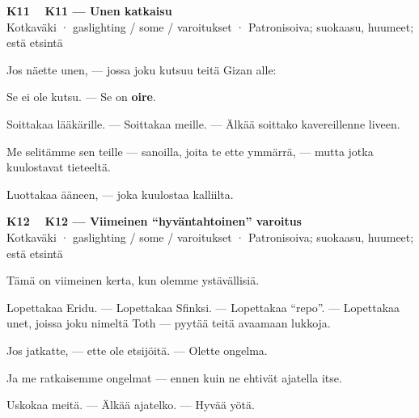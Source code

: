 \documentclass[a4paper,11pt]{article}
\begin{document}
\filbreak
\vspace{0.9mm}
\noindent
\begin{tcolorbox}[
  colframe=eaglecol,
  colback=white,
  boxrule=0.8pt,
  arc=0pt,
  outer arc=0pt,
  left=2.5mm, right=2.5mm, top=2mm, bottom=2mm,
  boxsep=0.5mm,
  sharp corners,
  enhanced,
  breakable=false
]
{\large\ttfamily\bfseries K11}~~
{\normalsize\bfseries K11 --- Unen katkaisu}\\[0.2em]
{\small\color{black!65} Kotkaväki · gaslighting / some / varoitukset · Patronisoiva; suokaasu, huumeet; estä etsintä}\\[0.35em]
{\normalsize\raggedright Jos näette unen, --- jossa joku kutsuu teitä Gizan alle:

Se ei ole kutsu. --- Se on \textbf{oire}.

Soittakaa lääkärille. --- Soittakaa meille. --- Älkää soittako kavereillenne liveen.

Me selitämme sen teille --- sanoilla, joita te ette ymmärrä, --- mutta jotka kuulostavat tieteeltä.

Luottakaa ääneen, --- joka kuulostaa kalliilta.}
\end{tcolorbox}

\filbreak
\vspace{0.9mm}
\noindent
\begin{tcolorbox}[
  colframe=eaglecol,
  colback=white,
  boxrule=0.8pt,
  arc=0pt,
  outer arc=0pt,
  left=2.5mm, right=2.5mm, top=2mm, bottom=2mm,
  boxsep=0.5mm,
  sharp corners,
  enhanced,
  breakable=false
]
{\large\ttfamily\bfseries K12}~~
{\normalsize\bfseries K12 --- Viimeinen ``hyväntahtoinen'' varoitus}\\[0.2em]
{\small\color{black!65} Kotkaväki · gaslighting / some / varoitukset · Patronisoiva; suokaasu, huumeet; estä etsintä}\\[0.35em]
{\normalsize\raggedright Tämä on viimeinen kerta, kun olemme ystävällisiä.

Lopettakaa Eridu. --- Lopettakaa Sfinksi. --- Lopettakaa ``repo''. --- Lopettakaa unet, joissa joku nimeltä Toth --- pyytää teitä avaamaan lukkoja.

Jos jatkatte, --- ette ole etsijöitä. --- Olette ongelma.

Ja me ratkaisemme ongelmat --- ennen kuin ne ehtivät ajatella itse.

Uskokaa meitä. --- Älkää ajatelko. --- Hyvää yötä.}
\end{tcolorbox}
\end{document}

